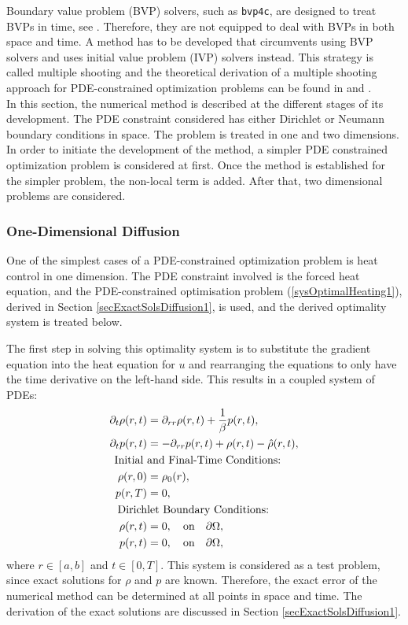 Boundary value problem (BVP) solvers, such as \texttt{bvp4c}, are designed to treat BVPs in time, see \cite{bvp4cPaper1}. Therefore, they are not equipped to deal with BVPs in both space and time. A method has to be developed that circumvents using BVP solvers and uses initial value problem (IVP) solvers instead. This strategy is called multiple shooting and the theoretical derivation of a multiple shooting approach for PDE-constrained optimization problems can be found in \cite{CarraroIndMultipleShooting} and \cite{CarraroDirectIndirectMultipleShooting}.
\\
In this section, the numerical method is described at the different stages of its development. 
The PDE constraint considered has either Dirichlet or Neumann boundary conditions in space. The problem is treated in one and two dimensions. In order to initiate the development of the method, a simpler PDE constrained optimization problem is considered at first. Once the method is established for the simpler problem, the non-local term is added. After that, two dimensional problems are considered.

\subsubsection*{One-Dimensional Diffusion} \label{secNumericsOneDDiffusion1}
One of the simplest cases of a PDE-constrained optimization problem is heat control in one dimension. The PDE constraint involved is the forced heat equation, and the PDE-constrained optimisation problem (\ref{sysOptimalHeating1}), derived in Section \ref{secExactSolsDiffusion1}, is used, and the derived optimality system is treated below. 

The first step in solving this optimality system is to substitute the gradient equation into the heat equation for $u$ and rearranging the equations to only have the time derivative on the left-hand side.
This results in a coupled system of PDEs: 
\begin{align}\label{sysOneDimHeatEqunOptisys1}
\partial_t \rho(r,t) &= \partial_{rr}\rho(r,t) + \frac{1}{\beta}p(r,t),\\
\partial_t p(r,t) &= - \partial_{rr} p(r,t) + \rho(r,t) -\hat{\rho}(r,t), \notag \\
\text{Initial } & \text{and  Final-Time Conditions:}\notag\\
\rho(r,0)&=\rho_0(r),\notag\\
p(r,T) &=0,\notag\\
\text{Dirich} &\text{let  Boundary Conditions:}\notag\\
\rho(r,t) &=0,\quad \text{on} \quad \partial \Omega,\notag\\
p(r,t) &=0,\quad \text{on} \quad \partial \Omega,\notag
\end{align}
where $r \in [a,b]$ and $t \in [0,T]$.
This system is considered as a test problem, since exact solutions for $\rho$ and $p$ are known. Therefore, the exact error of the numerical method can be determined at all points in space and time. The derivation of the exact solutions are discussed in Section \ref{secExactSolsDiffusion1}.

